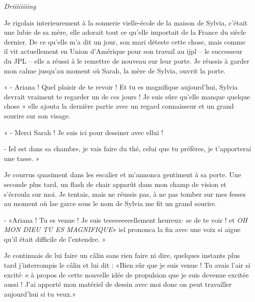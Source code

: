 \documentclass[12pt,hidelinks,a4paper]{book}
\begin{document}
\textit{Driiiiiiiing}\par

Je rigolais interieurement à la sonnerie vielle-école de la maison
de Sylvia, c'était une lubie de sa mère, elle adorait tout ce qu'elle
importait de la France du siècle dernier. De ce qu'elle m'a dit un
jour, son mari déteste cette chose, mais comme il vit actuellement
en Union d'Amérique pour son travail au \gls{ijpl} -- le successeur
du JPL -- elle a réussi à le remettre de nouveau sur leur porte.
Je réussis à garder mon calme jusqu'au moment où Sarah, la mère de
Sylvia, ouvrit la porte.\par

\bigskip

« - Ariana ! Quel plaisir de te revoir ! Et tu es magnifique aujourd'hui,
Sylvia devrait vraiment te regarder un de ces jours ! Je suis sûre
qu'elle manque quelque chose » elle ajouta la dernière partie avec
un regard connaisseur et un grand sourire sur son visage.

« - Merci Sarah ! Je suis ici pour dessiner avec ellui !

- Iel est dans sa chambre, je vais faire du thé, celui que tu préfères,
je t'apporterai une tasse. »

\bigskip

Je courrus quasiment dans les escalier et m'annonca gentiment à sa
porte. Une seconde plus tard, un flash de chair apparût dans mon champ
de vision et s'écroula sur moi. Je tentais, mais ne réussis pas, à
ne pas tomber sur mes fesses au moment où lae garce sous le nom de
Sylvia me fit un grand sourire.\par

\bigskip

- «Ariana ! Tu es venue ! Je suis teeeeeeeeellement heureux$\cdot$ se de
te voir ! et \textit{OH MON DIEU TU ES MAGNIFIQUE}» iel prononca
la fin avec une voix si aigue qu'il était difficile de l'entendre.
»

\bigskip

Je continuais de lui faire un câlin sans rien faire ni dire, quelques
instants plus tard j'interrompis le câlin et lui dit : «Bien sûr
que je suis venue ! Tu avais l'air si excité$\cdot$ e à propos de cette nouvelle
idée de propulsion que je suis devenue excitée aussi ! J'ai apporté
mon matériel de dessin avec moi donc on peut travailler aujourd'hui
si tu veux.»

\bigskip
\end{document}

